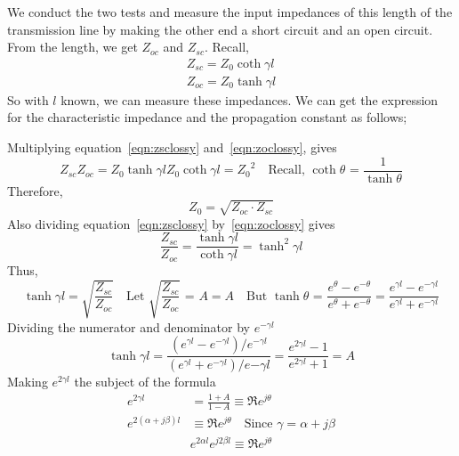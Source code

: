 We conduct the two tests and measure the input impedances of this length of the transmission line by making the other end a short circuit and an open circuit. From the length, we get $Z_{oc}$ and $Z_{sc}$. Recall,
\begin{align}
Z_{sc} = Z_0 \coth\gamma l\label{eqn:zsclossy}\\
Z_{oc} = Z_0 \tanh\gamma l\label{eqn:zoclossy}
\end{align}
So with $l$ known, we can measure these impedances. We can get the expression for the characteristic impedance and the propagation constant as follows;

Multiplying equation~\eqref{eqn:zsclossy} and~\eqref{eqn:zoclossy}, gives
\begin{dmath*}
Z_{sc}Z_{oc}
= Z_0\tanh\gamma l Z_0\coth\gamma l
= {Z_0}^2\quad\text{Recall, }\coth\theta\text{ = }\frac{1}{\tanh\theta}
\end{dmath*}
Therefore,
\begin{equation}
Z_0 = \sqrt{Z_{oc}\cdot Z_{sc}}
\label{eqn:xteristicsimplossy2}
\end{equation}
Also dividing equation~\eqref{eqn:zsclossy} by~\eqref{eqn:zoclossy} gives
\begin{dmath*}
\frac{Z_{sc}}{Z_{oc}} = \frac{\tanh\gamma l}{\coth\gamma l} 
= \tanh^2\gamma l
\end{dmath*}
Thus,
\begin{dmath*}
\tanh\gamma l = \sqrt{\frac{Z_{sc}}{Z_{oc}}}\quad\text{Let }\sqrt{\frac{Z_{sc}}{Z_{oc}}}\text{ = }A
= A\quad\text{But }\tanh \theta\text{ = }\frac{e^\theta - e^{-\theta}}{e^\theta + e^{-\theta}}
=\frac{e^{\gamma l} - e^{-\gamma l}}{e^{\gamma l} + e^{-\gamma l}}
\end{dmath*}
Dividing the numerator and denominator by $e^{-\gamma l}$
\begin{dmath*}
\tanh\gamma l = \frac{(e^{\gamma l} - e^{-\gamma l})/e^{-\gamma l}}{(e^{\gamma l} + e^{-\gamma l})/e{-\gamma l}}
= \frac{e^{2\gamma l} - 1}{e^{2\gamma l} + 1} = A
\end{dmath*}
Making $e^{2\gamma l}$ the subject of the formula
\begin{align*}
e^{2\gamma l} &= \frac{1 +A}{1 - A}\equiv \Re e^{j\theta}\\
e^{2(\alpha + j\beta)l} &\equiv \Re e^{j\theta}\quad\text{Since }\gamma = \alpha + j\beta
\end{align*}
\begin{align}
e^{2\alpha l}e^{j2\beta l} \equiv \Re e^{j\theta}
\label{eqn:generaleqnimp}
\end{align}
